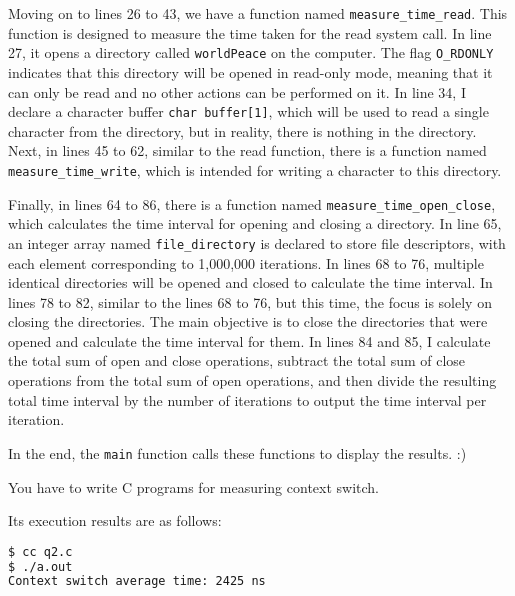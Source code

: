 \documentclass[10pt, answers]{exam}
\begin{document}
\begin{questions}
\begin{solution}
Moving on to lines 26 to 43, we have a function named \texttt{measure\_time\_read}. This function is designed to measure the time taken for the read system call. In line 27, it opens a directory called \texttt{worldPeace} on the computer. The flag \texttt{O\_RDONLY} indicates that this directory will be opened in read-only mode, meaning that it can only be read and no other actions can be performed on it. In line 34, I declare a character buffer \texttt{char buffer[1]}, which will be used to read a single character from the directory, but in reality, there is nothing in the directory. Next, in lines 45 to 62, similar to the read function, there is a function named \texttt{measure\_time\_write}, which is intended for writing a character to this directory.

Finally, in lines 64 to 86, there is a function named \texttt{measure\_time\_open\_close}, which calculates the time interval for opening and closing a directory. In line 65, an integer array named \texttt{file\_directory} is declared to store file descriptors, with each element corresponding to 1,000,000 iterations. In lines 68 to 76, multiple identical directories will be opened and closed to calculate the time interval. In lines 78 to 82, similar to the lines 68 to 76, but this time, the focus is solely on closing the directories. The main objective is to close the directories that were opened and calculate the time interval for them. In lines 84 and 85, I calculate the total sum of open and close operations, subtract the total sum of close operations from the total sum of open operations, and then divide the resulting total time interval by the number of iterations to output the time interval per iteration.

In the end, the \texttt{main} function calls these functions to display the results. :)



\end{solution}

\question 
You have to write C programs for measuring context switch.

\begin{solution}



Its execution results are as follows:

\begin{lstlisting}[language=bash]
$ cc q2.c
$ ./a.out
Context switch average time: 2425 ns
\end{lstlisting}


\end{solution}
\end{questions}
\end{document}
